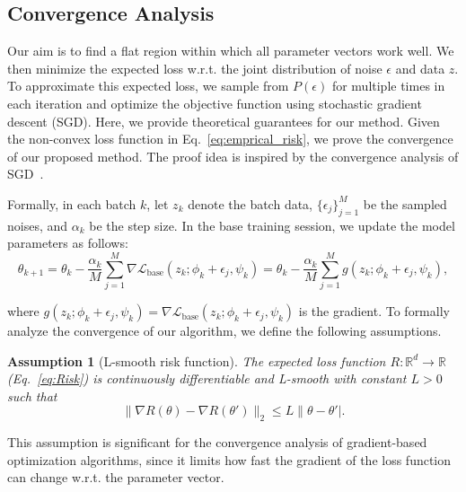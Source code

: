 \documentclass{article}
\newtheorem{assumption}{Assumption}[section]
\begin{document}
 \subsection{Convergence Analysis}\label{sec:theory}
Our aim is to find a flat region within which all parameter vectors work well. We then minimize the expected loss w.r.t. the joint distribution of noise $\epsilon$ and data $z$. To approximate this expected loss, we sample from $P(\epsilon)$ for multiple times in each iteration and optimize the objective function using stochastic gradient descent (SGD). Here, we provide theoretical guarantees for our method. Given the non-convex loss function in Eq.~\ref{eq:emprical_risk}, we prove the convergence of our proposed method. The proof idea is inspired by the convergence analysis of SGD~\citep{bottou2018optimization,Kiefer1952StochasticEO}. 

Formally, in each batch $k$, let $z_k$ denote the batch data, $\{\epsilon_j\}_{j=1}^{M}$ be the sampled noises, and $\alpha_k$ be the step size. In the base training session, we update the model parameters as follows:
\begin{equation}\label{eq:base_update}
    \theta_{k+1} = \theta_{k} - \frac{\alpha_k}{M}\sum_{j=1}^{M}\nabla\mathcal{L}_{\text{base}}(z_k;\phi_k +\epsilon_j, \psi_k) = \theta_{k} - \frac{\alpha_k}{M}\sum_{j=1}^{M}g(z_k;\phi_k +\epsilon_j, \psi_k),
\end{equation}

where $g(z_k;\phi_k +\epsilon_j, \psi_k)=\nabla\mathcal{L}_{\text{base}}(z_k;\phi_k +\epsilon_j, \psi_k)$ is the gradient. To formally analyze the convergence of our algorithm, we define the following assumptions.

\begin{assumption}[L-smooth risk function] \label{assump:risk function}
The expected loss function $R: \mathbb{R}^d\to\mathbb{R}$ {\rm(Eq.~\ref{eq:Risk})} is continuously differentiable and L-smooth with constant $L>0$ such that \label{assump:L-smooth}
\begin{equation}
    \|\nabla R(\theta) - \nabla R(\theta')\|_2 \leq L\|\theta-\theta'|.
\end{equation}
\end{assumption}

This assumption is significant for the convergence analysis of gradient-based optimization algorithms, since it limits how fast the gradient of the loss function can change w.r.t. the parameter vector.
\end{document}

